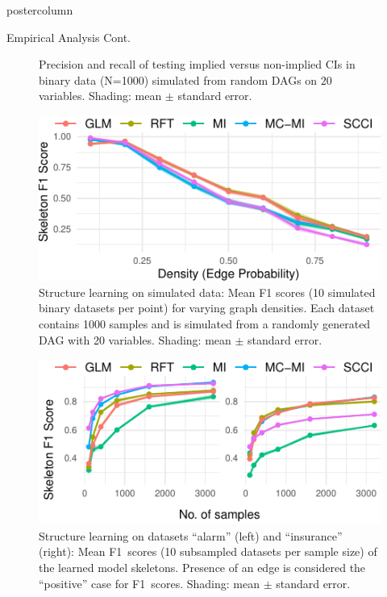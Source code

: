 \documentclass{beamer}
\begin{document}
\begin{frame}
\begin{columns}
\begin{column}{0.33\textwidth}
\begin{beamercolorbox}[center]{postercolumn}
\begin{minipage}{.98\textwidth}
{\begin{myblock}{Empirical Analysis Cont.}
\begin{figure}
							\caption{Precision and recall of testing implied versus non-implied CIs
								 in binary data (N=1000) simulated from random DAGs on $ 20 $ variables.
								 Shading: mean $\pm$ standard error.} 
							\label{fig:model_testing}
						\end{figure}
						\begin{figure}
							\centering
							\includegraphics[scale=3]{../in_person/imgs/sl_density.pdf}
							\caption{Structure learning on simulated data: Mean F1 scores (10
								 simulated binary datasets per point) for varying graph densities. Each
								 dataset contains 1000 samples and is simulated from a randomly
								 generated DAG with 20 variables. Shading: mean $\pm$ standard error.}
							\label{fig:sl_density}
						\end{figure}
						\begin{figure}
							\centering
							\includegraphics[scale=3]{../in_person/imgs/sl.pdf}
							\caption{Structure learning on datasets ``alarm'' (left) and ``insurance'' (right):
								Mean F1~scores (10 subsampled datasets per sample size) of the learned
								model skeletons.  Presence of an edge is considered the ``positive'' case
								for F1~scores. Shading: mean $\pm$ standard error.}
							\label{fig:sl}
						\end{figure}
						\begin{figure}

\end{figure}
\end{myblock}}
\end{minipage}
\end{beamercolorbox}
\end{column}
\end{columns}
\end{frame}
\end{document}
